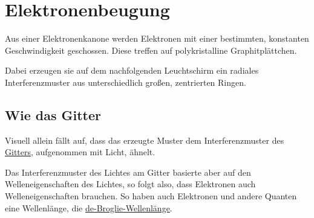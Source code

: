 \documentclass{article}
\begin{document}
\section{Elektronenbeugung}
Aus einer Elektronenkanone werden Elektronen mit einer bestimmten, konstanten Geschwindigkeit geschossen. Diese treffen auf polykristalline Graphitplättchen.
 
Dabei erzeugen sie auf dem nachfolgenden Leuchtschirm ein radiales Interferenzmuster aus unterschiedlich großen, zentrierten Ringen.
 
\subsection{Wie das Gitter}
Visuell allein fällt auf, dass das erzeugte Muster dem Interferenzmuster des \hyperref[Das Gitter]{Gitters}, aufgenommen mit Licht, ähnelt. 
 
Das Interferenzmuster des Lichtes am Gitter basierte aber auf den Welleneigenschaften des Lichtes, so folgt also, dass Elektronen auch Welleneigenschaften brauchen. So haben auch Elektronen und andere Quanten eine Wellenlänge, die \hyperref[Die de-Broglie-Wellenlänge]{de-Broglie-Wellenlänge}.  
\end{document}
